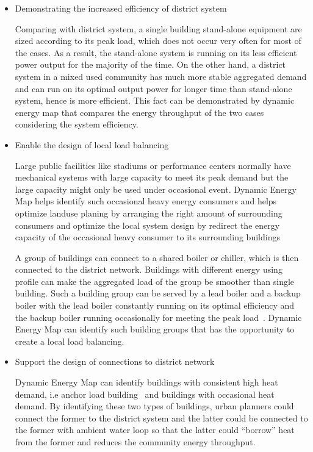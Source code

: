 \documentclass[hidelinks,12pt]{article}
\begin{document}
\begin{itemize}
\item Demonstrating the increased efficiency of district system
  
  Comparing with district system, a single building stand-alone
  equipment are sized according to its peak load, which does not occur
  very often for most of the cases. As a result, the stand-alone
  system is running on its less efficient power output for the
  majority of the time. On the other hand, a district system in a
  mixed used community has much more stable aggregated demand and can
  run on its optimal output power for longer time than stand-alone
  system, hence is more efficient. This fact can be demonstrated by
  dynamic energy map that compares the energy throughput of the two
  cases considering the system efficiency.

\item Enable the design of local load balancing

  Large public facilities like stadiums or performance centers
  normally have mechanical systems with large capacity to meet its
  peak demand but the large capacity might only be used under
  occasional event. Dynamic Energy Map helps identify such occasional
  heavy energy consumers and helps optimize landuse planing by
  arranging the right amount of surrounding consumers and optimize the
  local system design by redirect the energy capacity of the
  occasional heavy consumer to its surrounding
  buildings~\cite{IDEA2012}
  
  \par A group of buildings can connect to a shared boiler or chiller,
  which is then connected to the district network. Buildings with
  different energy using profile can make the aggregated load of the
  group be smoother than single building. Such a building group can be
  served by a lead boiler and a backup boiler with the lead boiler
  constantly running on its optimal efficiency and the backup boiler
  running occasionally for meeting the peak
  load~\cite{IDEA2012}. Dynamic Energy Map can identify such building
  groups that has the opportunity to create a local load balancing.

\item Support the design of connections to district network

  Dynamic Energy Map can identify buildings with consistent high heat
  demand, i.e anchor load building~\cite{IDEA2012} and buildings with
  occasional heat demand. By identifying these two types of buildings,
  urban planners could connect the former to the district system and
  the latter could be connected to the former with ambient water loop
  so that the latter could ``borrow'' heat from the former and reduces
  the community energy throughput.


\end{itemize}
\end{document}
